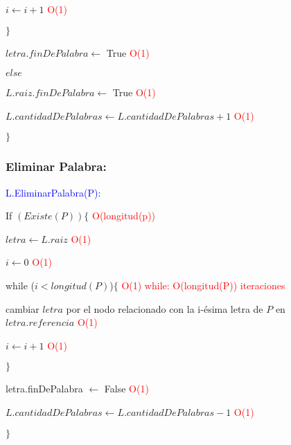 \documentclass[a4paper]{article}
\begin{document}
\hspace{1.5cm} $i \leftarrow i+1$\hspace{0.5cm} \textcolor{red}{O(1)}

\hspace{1cm}$\}$

\hspace{1cm}  $letra.finDePalabra \leftarrow$ True \hspace{0.5cm} \textcolor{red}{O(1)}
  
\hspace{0.5cm} $else$

\hspace{1cm} $L.raiz.finDePalabra \leftarrow$ True \hspace{0.5cm} \textcolor{red}{O(1)}  
                
\hspace{1cm} $L.cantidadDePalabras \leftarrow L.cantidadDePalabras + 1$\hspace{0.5cm} \textcolor{red}{O(1)} 

\hspace{0.5cm}$\}$


\subsubsection*{Eliminar Palabra:}
\textcolor{blue}{L.EliminarPalabra(P):}

If $(Existe(P)) \{$\hspace{0.5cm} \textcolor{red}{O(longitud(p))} 

\hspace{0.5cm}	$letra \leftarrow L.raiz$\hspace{0.5cm} \textcolor{red}{O(1)} 

\hspace{0.5cm} $	i \leftarrow 0$ \hspace{0.5cm} \textcolor{red}{O(1)} 

\hspace{0.5cm} 	while ($i < longitud(P)$)$\{$\hspace{0.5cm} \hspace{0.5cm} \textcolor{red}{O(1)}  \hspace{0.5cm} \textcolor{red}{while: O(longitud(P)) iteraciones}

\hspace{1cm} cambiar $letra$ por el nodo relacionado con la i-ésima letra de $P$ en $letra.referencia$\hspace{0.5cm} \textcolor{red}{O(1)} 
  

\hspace{1cm} $i \leftarrow i+1$	\hspace{0.5cm} \textcolor{red}{O(1)} 

\hspace{0.5cm}$\}$

\hspace{0.5cm} letra.finDePalabra $\leftarrow$ False\hspace{0.5cm} \textcolor{red}{O(1)} 

\hspace{0.5cm} $ L.cantidadDePalabras \leftarrow L.cantidadDePalabras - 1$ \hspace{0.5cm} \textcolor{red}{O(1)} 

$\}$
\end{document}
